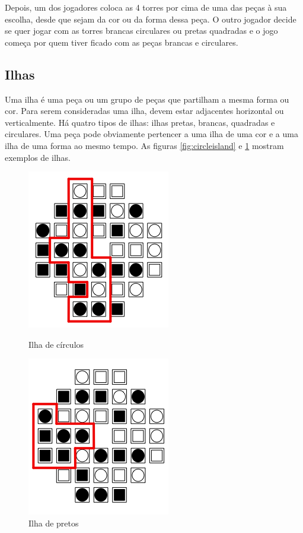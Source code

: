 \documentclass[a4paper]{article}
\begin{document}
Depois, um dos jogadores coloca as 4 torres por cima de uma das peças à sua escolha, desde que sejam da cor ou da forma dessa peça. O outro jogador decide se quer jogar com as torres brancas circulares ou pretas quadradas e o jogo começa por quem tiver ficado com as peças brancas e circulares.

\subsection{Ilhas}

Uma ilha é uma peça ou um grupo de peças que partilham a mesma forma ou cor. Para serem consideradas uma ilha, devem estar adjacentes horizontal ou verticalmente. Há quatro tipos de ilhas: ilhas pretas, brancas, quadradas e circulares. Uma peça pode obviamente pertencer a uma ilha de uma cor e a uma ilha de uma forma ao mesmo tempo. As figuras \ref{fig:circleisland} e \ref{fig:blackisland} mostram exemplos de ilhas.

\begin{figure}[h]

\begin{minipage}{0.5\linewidth}
\centering
\includegraphics[scale=0.75]{island1.png}
\caption{Ilha de círculos}
\label{fig:circleisland}
\end{minipage}
\quad
\begin{minipage}{0.5\linewidth}
\centering
\includegraphics[scale=0.75]{island2.png}
\caption{Ilha de pretos}
\label{fig:blackisland}
\end{minipage}

\end{figure}
\end{document}
